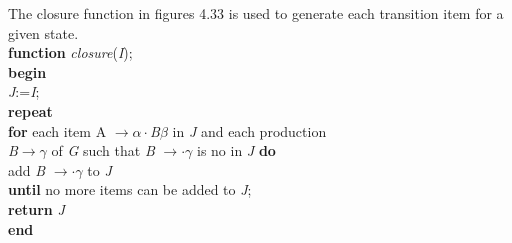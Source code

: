 \documentclass{article}
\begin{document}
The closure function in figures 4.33 is used to generate each transition item for a given state.\\
\hspace*{1in}\textbf{function} \textit{closure}(\textit{I});\\
\hspace*{1in}\textbf{begin}\\
\hspace*{1.25in}\textit{J}:=\textit{I};\\
\hspace*{1.25in}\textbf{repeat}\\
\hspace*{1.5in}\textbf{for} each item A $\rightarrow \alpha\cdot$\textit{B}$\beta$ in \textit{J} and each production\\
\hspace*{1.75in}\textit{B}$\rightarrow \gamma$ of \textit{G} such that \textit{B} $\rightarrow \cdot\gamma$ is no in \textit{J} \textbf{do}\\
\hspace*{2in}add \textit{B} $\rightarrow \cdot\gamma$ to \textit{J}\\
\hspace*{1.25in}\textbf{until} no more items can be added to \textit{J};\\
\hspace*{1.25in}\textbf{return} \textit{J}\\
\hspace*{1in}\textbf{end}\\
\end{document}
